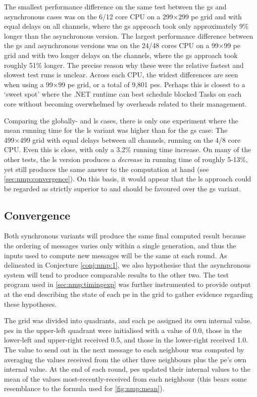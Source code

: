 The smallest performance difference on the same test between the \gls{gs} and asynchronous cases was on the 6/12 core CPU on a 299×299 \gls{pe} grid and with equal delays on all channels, where the \gls{gs} approach took only approximately 9\% longer than the asynchronous version.  The largest performance difference between the \gls{gs} and asynchronous versions was on the 24/48 cores CPU on a 99×99 \gls{pe} grid and with two longer delays on the channels, where the \gls{gs} approach took roughly 51\% longer.  The precise reason why these were the relative fastest and slowest test runs is unclear.  Across each CPU, the widest differences are seen when using a 99×99 \gls{pe} grid, or a total of 9,801 \glspl{pe}.  Perhaps this is closest to a `sweet spot' where the .NET runtime can best schedule blocked Tasks on each core without becoming overwhelmed by overheads related to their management.

Comparing the globally- and \gls{ls} cases, there is only one experiment where the mean running time for the \gls{ls} variant was higher than for the \gls{gs} case:  The 499×499 grid with equal delays between all channels, running on the 4/8 core CPU.  Even this is close, with only a 3.2\% running time increase.   On many of the other tests, the \gls{ls} version produces a \emph{decrease} in running time of roughly 5-13\%, yet still produces the same answer to the computation at hand (see \cref{sec:nmp:convergence}).  On this basis, it would appear that the \gls{ls} approach could be regarded as strictly superior to and should be favoured over the \gls{gs} variant.

\subsection{\label{sec:nmp:convergence}Convergence}
Both synchronous variants will produce the same final computed result because the ordering of messages varies only within a single generation, and thus the inputs used to compute new messages will be the same at each round.  As delineated in Conjecture \ref{conj:nmp:1}, we also hypothesise that the asynchronous system will tend to produce comparable results to the other two.  The test program used in \cref{sec:nmp:timingexp} was further instrumented to provide output at the end describing the state of each \gls{pe} in the grid to gather evidence regarding these hypotheses.

The grid was divided into quadrants, and each \gls{pe} assigned its own internal value.  \Glspl{pe} in the upper-left quadrant were initialised with a value of 0.0, those in the lower-left and upper-right received 0.5, and those in the lower-right received 1.0.  The value to send out in the next message to each neighbour was computed by averaging the values received from the other three neighbours plus the \gls{pe}'s own internal value.  At the end of each round, \glspl{pe} updated their internal values to the mean of the values most-recently-received from each neighbour (this bears some resemblance to the formula used for \cref{fig:nmp:mean}).  %

